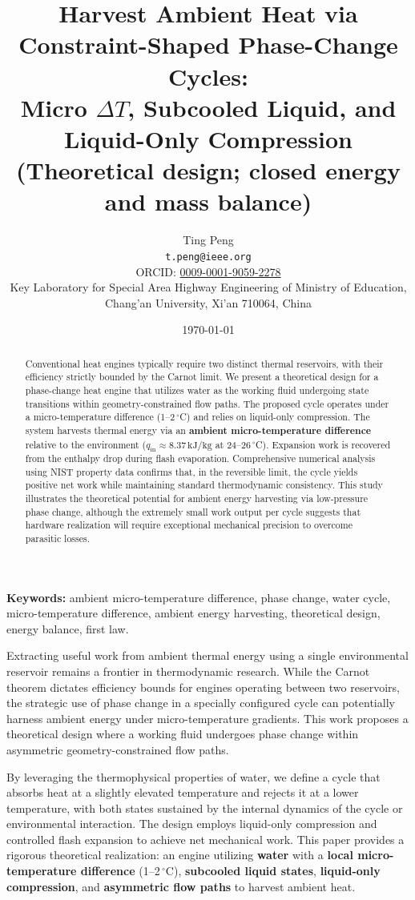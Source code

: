 \documentclass[11pt,a4paper]{article}
\title{Harvest Ambient Heat via Constraint-Shaped Phase-Change Cycles:\\
Micro $\Delta T$, Subcooled Liquid, and Liquid-Only Compression\\
\vspace{0.3em}
{\normalsize (Theoretical design; closed energy and mass balance)}}
\author{Ting Peng\\
  \texttt{t.peng@ieee.org}\\
  ORCID: \href{https://orcid.org/0009-0001-9059-2278}{0009-0001-9059-2278}\\
  Key Laboratory for Special Area Highway Engineering of Ministry of Education,\\
  Chang'an University, Xi'an 710064, China}
\date{\today}
\begin{document}
\maketitle

\begin{abstract}
Conventional heat engines typically require two distinct thermal reservoirs, 
with their efficiency strictly bounded by the Carnot limit. We present a 
theoretical design for a phase-change heat engine that utilizes water as the 
working fluid undergoing state transitions within geometry-constrained 
flow paths. The proposed cycle operates under a micro-temperature 
difference (1--2\,$^\circ$C) and relies on liquid-only compression. 
The system harvests thermal energy via an \textbf{ambient micro-temperature 
difference} relative to the environment ($q_{\mathrm{in}} \approx 
8.37\,\mathrm{kJ}/\mathrm{kg}$ at 24--26\,$^\circ$C). Expansion work is 
recovered from the enthalpy drop during flash evaporation. Comprehensive 
numerical analysis using NIST property data confirms that, in the 
reversible limit, the cycle yields positive net work while maintaining 
standard thermodynamic consistency. This study illustrates the theoretical 
potential for ambient energy harvesting via low-pressure phase change, 
although the extremely small work output per cycle suggests that hardware 
realization will require exceptional mechanical precision to overcome 
parasitic losses.
\end{abstract}

\noindent \textbf{Keywords:} ambient micro-temperature difference, phase change, water cycle, 
micro-temperature difference, ambient energy harvesting, theoretical design, 
energy balance, first law.

Extracting useful work from ambient thermal energy using a single 
environmental reservoir remains a frontier in thermodynamic research. 
While the Carnot theorem dictates efficiency bounds for engines operating 
between two reservoirs, the strategic use of phase change in a 
specially configured cycle can potentially harness ambient energy under 
micro-temperature gradients. This work proposes a theoretical design 
where a working fluid undergoes phase change within asymmetric geometry-constrained 
flow paths.

By leveraging the thermophysical properties of water, we define a cycle 
that absorbs heat at a slightly elevated temperature and rejects it at a 
lower temperature, with both states sustained by the internal dynamics 
of the cycle or environmental interaction. The design employs 
liquid-only compression and controlled flash expansion to achieve net 
mechanical work. This paper provides a rigorous theoretical realization: an 
engine utilizing \textbf{water} with a \textbf{local micro-temperature 
difference} (1--2\,$^\circ$C), \textbf{subcooled liquid states}, 
\textbf{liquid-only compression}, and \textbf{asymmetric flow paths} 
to harvest ambient heat.
\end{document}
